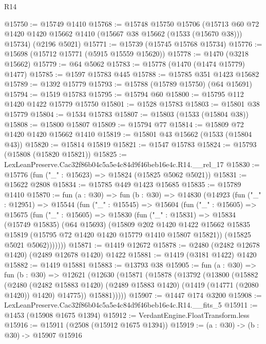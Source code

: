 \begin{lexlean}{R14}
\begin{coremodule}
@15750 := @15749 @1410
@15768 := @15748
    @15750
    @15706
    (@15713 @60 @72 @1420 @1420 @15662 @1410 (@15667 @38 @15662 (@1533 (@15670 @38))) @15734)
    (@2196 @5021)
@15771 := @15739 (@15745 @15768 @15734)
@15776 := @15698 (@15712 @15771 (@5915 @15559 @15620))
@15778 := @1470 (@3218 @15662)
@15779 := @64 @5062
@15783 := @15778 (@1470 (@1474 @15779) @1477)
@15785 := @1597 @15783 @445
@15788 := @15785 @351 @1423 @15682
@15789 := @1392 @15779
@15793 := @15788 (@15789 @15750) (@64 @15691)
@15794 := @1519 @15783
@15795 := @15794 @60
@15800 := @15795 @112 @1420 @1422 @15779 @15750
@15801 := @1528 @15783
@15803 := @15801 @38 @15779
@15804 := @1534 @15783
@15807 := @15803 (@1533 (@15804 @38))
@15808 := @15800 @15807
@15809 := @15794 @77
@15814 := @15809 @72 @1420 @1420 @15662 @1410
@15819 := @15801 @43 @15662 (@1533 (@15804 @43))
@15820 := @15814 @15819
@15821 := @1547 @15783
@15824 := @15793 (@15808 (@15820 @15821))
@15825 := LexLeanPreserve.Cac32f86b04c5a5e4c84d9f46beb16e4c.R14.__rel_17
@15830 := @15776 (fun ("_" : @15623) => @15824 (@15825 @5062 @5021))
@15831 := @15622 @2808
@15834 := @15785 @449 @1423 @15685
@15835 := @15789 @1410
@15870 := fun (a : @30) =>
  fun (b : @30) =>
  @14830
    (@14923
      (fun ("_" : @12951) =>
      @15544
        (fun ("_" : @15545) =>
        @15604
          (fun ("_" : @15605) =>
          @15675
            (fun ("_" : @15605) =>
            @15830
              (fun ("_" : @15831) =>
              @15834
                (@15749 @15835)
                (@64 @15693)
                (@15809
                  @202
                  @1420
                  @1422
                  @15662
                  @15835
                  @15819
                  (@15795 @72 @1420 @1420 @15779 @1410 @15807 @15821))
                (@15825 @5021 @5062)))))))
@15871 := @1419 @12672
@15878 := @2480 (@2482 @12678 @1420) (@2489 @12678 @1420) @1422
@15881 := @1419 (@3181 @1422) @1420
@15882 := @1419 @15881
@15883 := @13793 @38
@15905 := fun (a : @30) =>
  fun (b : @30) =>
  @12621
    (@12630
      (@15871
        (@15878
          (@13792
            (@13800
              (@15882
                (@2480
                  (@2482 @15883 @1420)
                  (@2489 @15883 @1420)
                  (@1419 (@14771 (@2080 @1420)) @1420)
                  @14775))
              @15881)))))
@15907 := @1447 @174 @3200
@15908 := LexLeanPreserve.Cac32f86b04c5a5e4c84d9f46beb16e4c.R14.__fits_5
@15911 := @1453 (@15908 @1675 @1394)
@15912 := VerdantEngine.FloatTransform.less
@15916 := @15911 (@2508 (@15912 @1675 @1394))
@15919 := (a : @30) -> (b : @30) -> @15907 @15916

\end{coremodule}
\end{lexlean}
